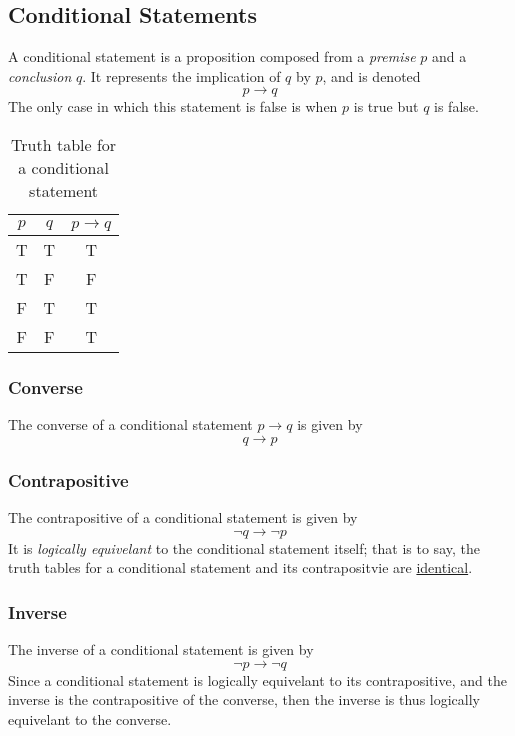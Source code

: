 \documentclass[twocolumn]{report}
\begin{document}
\subsection{Conditional Statements}
A conditional statement is a proposition composed from a \textit{premise} $p$ and a \textit{conclusion} $q$. 
It represents the implication of $q$ by $p$, and is denoted 
\[
	p \rightarrow q
\]
The only case in which this statement is false is when $p$ is true but $q$ is false. 
\begin{table}[h]
	\centering
	\label{tab: conditional-statement-truth-table}
	\begin{tabular}{cc|c}
		$p$ & $q$ & $p \rightarrow q$ \\ \hline
		T & T & T \\
		T & F & F \\
		F & T & T \\
		F & F & T \\
	\end{tabular}
	\caption{Truth table for a conditional statement}
\end{table}

\subsubsection{Converse}
The converse of a conditional statement $p \rightarrow q$ is given by
\[
	q \rightarrow p
\]

\subsubsection{Contrapositive}
The contrapositive of a conditional statement is given by 
\[
	\neg q \rightarrow \neg p 
\]
It is \textit{logically equivelant} to the conditional statement itself; that is to say, the truth tables for a conditional statement and its contrapositvie are \underline{identical}. 

\subsubsection{Inverse}
The inverse of a conditional statement is given by
\[
	\neg p \rightarrow \neg q
\]
Since a conditional statement is logically equivelant to its contrapositive, and the inverse is the contrapositive of the converse, then the inverse is thus logically equivelant to the converse.
\end{document}

